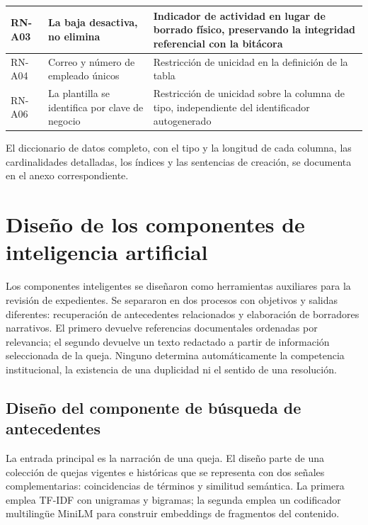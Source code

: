 \begin{longtable}{|p{1.9cm}|p{5.6cm}|p{6.6cm}|}
		RN-A03 & La baja desactiva, no elimina & Indicador de actividad en lugar de borrado físico,
		preservando la integridad referencial con la bitácora \\ \hline
	
		RN-A04 & Correo y número de empleado únicos & Restricción de unicidad en la definición de la
		tabla \\ \hline
	
		RN-A06 & La plantilla se identifica por clave de negocio & Restricción de unicidad sobre la
		columna de tipo, independiente del identificador autogenerado \\ \hline
	\end{longtable}
	
	\normalsize
	\setlength{\tabcolsep}{6pt}
	\renewcommand{\arraystretch}{1}
	
	El diccionario de datos completo, con el tipo y la longitud de cada columna, las cardinalidades
	detalladas, los índices y las sentencias de creación, se documenta en el anexo correspondiente.
	
	\section{Diseño de los componentes de inteligencia artificial}
	\label{sec:diseno_ia}
	Los componentes inteligentes se diseñaron como herramientas auxiliares para la revisión de
	expedientes. Se separaron en dos procesos con objetivos y salidas diferentes: recuperación
	de antecedentes relacionados y elaboración de borradores narrativos. El primero devuelve
	referencias documentales ordenadas por relevancia; el segundo devuelve un texto redactado
	a partir de información seleccionada de la queja. Ninguno determina automáticamente la
	competencia institucional, la existencia de una duplicidad ni el sentido de una resolución.

	\subsection{Diseño del componente de búsqueda de antecedentes}
	\label{sec:diseno_antecedentes}
	La entrada principal es la narración de una queja. El diseño parte de una colección de
	quejas vigentes e históricas que se representa con dos señales complementarias:
	coincidencias de términos y similitud semántica. La primera emplea TF-IDF con unigramas y
	bigramas; la segunda emplea un codificador multilingüe MiniLM para construir embeddings
	de fragmentos del contenido.

